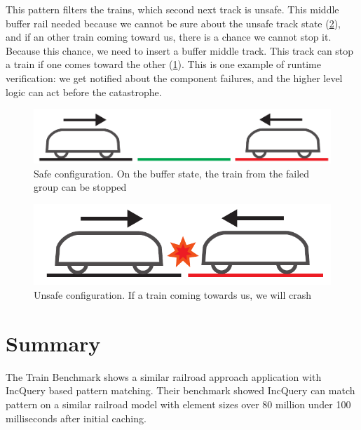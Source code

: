 This pattern filters the trains, which second next track is unsafe. This middle buffer rail needed because we cannot be sure about the unsafe track state (\cref{fig:case_study:unsafe}), and if an other train coming toward us, there is a chance we cannot stop it. Because this chance, we need to insert a buffer middle track. This track can stop a train if one comes toward the other (\cref{fig:case_study:safe}). This is one example of runtime verification: we get notified about the component failures, and the higher level logic can act before the catastrophe.

\newpage
\begin{figure}[H]
	\centering
	\includegraphics[width=0.7\linewidth]{include/figures/chapter_6/failsafe/safe}
	\caption{Safe configuration. On the buffer state, the train from the failed group can be stopped}
	\label{fig:case_study:safe}
\end{figure}

\begin{figure}[H]
	\centering
	\includegraphics[width=0.5\linewidth]{include/figures/chapter_6/failsafe/unsafe}
	\caption{Unsafe configuration. If a train coming towards us, we will crash}
	\label{fig:case_study:unsafe}
\end{figure}

\section{Summary}

The Train Benchmark\cite{TrainBenchmark} shows a similar railroad approach application with IncQuery based pattern matching. Their benchmark showed IncQuery can match pattern on a similar railroad model with element sizes over 80 million under 100 milliseconds after initial caching.
